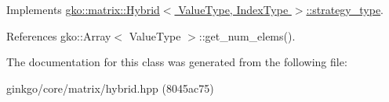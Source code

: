 Implements \hyperlink{classgko_1_1matrix_1_1Hybrid_1_1strategy__type_a0a0cd4024f27c7d0f286f35fc0a6de60}{gko\+::matrix\+::\+Hybrid$<$ Value\+Type, Index\+Type $>$\+::strategy\+\_\+type}.



References gko\+::\+Array$<$ Value\+Type $>$\+::get\+\_\+num\+\_\+elems().



The documentation for this class was generated from the following file\+:\begin{DoxyCompactItemize}
\item 
ginkgo/core/matrix/hybrid.\+hpp (8045ac75)\end{DoxyCompactItemize}

